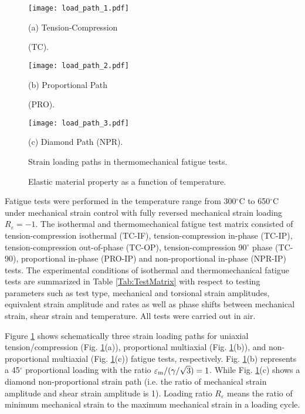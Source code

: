 \documentclass[preprint,5p,twocolumn,11pt,sort&compress]{elsarticle}
\begin{document}
\begin{figure}
  \begin{minipage}[t]{0.5\linewidth}
  \nonumber
    \centering
    \texttt{[image: load\_path\_1.pdf]}
    \centerline{\small (a) Tension-Compression}
    \centerline{\small (TC).}
  \end{minipage}%
  \begin{minipage}[t]{0.5\linewidth}
    \centering
    \texttt{[image: load\_path\_2.pdf]}
    \centerline{\small (b) Proportional Path}
    \centerline{\small (PRO).}
  \end{minipage}
  \centering
  \begin{minipage}[t]{0.5\linewidth}
  \nonumber
    \centering
    \texttt{[image: load\_path\_3.pdf]}
    \centerline{\small (c) Diamond Path (NPR).}
  \end{minipage}%
  \caption{Strain loading paths in thermomechanical fatigue tests.}
  \label{Fig:LoadPath}
\end{figure}

\begin{figure}[!htp]
\caption{Elastic material property as a function of temperature.}
\label{Fig:plot_elastic_by_temperature_in718}
\end{figure}

Fatigue tests were performed in the temperature range from 300$^\circ$C to 650$^\circ$C under mechanical strain control with fully reversed mechanical strain loading $R_{\varepsilon}=-1$. The isothermal and thermomechanical fatigue test matrix consisted of tension-compression isothermal (TC-IF), tension-compression in-phase (TC-IP), tension-compression out-of-phase (TC-OP), tension-compression 90$^\circ$ phase (TC-90), proportional in-phase (PRO-IP) and non-proportional in-phase (NPR-IP) tests. The experimental conditions of isothermal and thermomechanical fatigue tests are summarized in Table \ref{Tab:TestMatrix} with respect to testing parameters such as test type, mechanical and torsional strain amplitudes, equivalent strain amplitude and rates as well as phase shifts between mechanical strain, shear strain and temperature. All tests were carried out in air. 

Figure \ref{Fig:LoadPath} shows schematically three strain loading paths for uniaxial tension/compression (Fig. \ref{Fig:LoadPath}(a)), proportional multiaxial (Fig. \ref{Fig:LoadPath}(b)), and non-proportional multiaxial (Fig. \ref{Fig:LoadPath}(c)) fatigue tests, respectively. Fig. \ref{Fig:LoadPath}(b) represents a 45$^\circ$ proportional loading with the ratio $\varepsilon_{\rm m}/(\gamma/\sqrt{3})=1$. While Fig. \ref{Fig:LoadPath}(c) shows a diamond non-proportional strain path (i.e. the ratio of mechanical strain amplitude and shear strain amplitude is 1). Loading ratio $R_\varepsilon$ means the ratio of minimum mechanical strain to the maximum mechanical strain in a loading cycle. 
\end{document}
